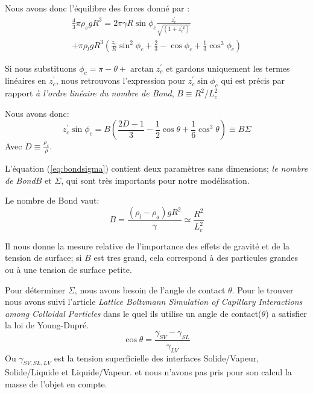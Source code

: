         Nous avons donc l'équilibre des forces donné par :
        \begin{multline}
            \frac{4}{3}\pi\rho_{s}gR^3 =2\pi\gamma R \sin\phi_c \frac{z_c^{'}}{\sqrt{(1+z_c^{'2})}} 
            \\+ \pi\rho_l g R^3 \left(\frac{z_c}{R}\sin^2 \phi_c + \frac{2}{3}-\cos\phi_c+\frac{1}{3}\cos^3 \phi_c\right)
            \label{eq:BalanceOfForces}
        \end{multline}


        Si nous substituons \(\phi_c = \pi - \theta + \arctan z_c^{'}\) et gardons uniquement les termes linéaires en \(z_c^{'}\), nous retrouvons l'expression pour \(z_c^{'}\sin \phi_c\) qui est précis par rapport \textit{à l'ordre linéaire du nombre de Bond}, \(B \equiv R^2/L_c^2\) 

        Nous avons donc:
        \begin{equation}
            z_c^{'}\sin \phi_c = B\left(\frac{2D-1}{3}-\frac{1}{2}\cos \theta + \frac{1}{6} \cos^3 \theta\right) \equiv B\Sigma
            \label{eq:bondsigma}
        \end{equation}
        Avec \(D \equiv \frac{\rho_s}{\rho}\).


        L'équation (\ref{eq:bondsigma}) contient deux paramètres sans dimensions; \textit{le nombre de Bond}$B$ et $\Sigma$, qui sont très importants pour notre modélisation.

        Le nombre de Bond vaut:
        \begin{equation}
            B = \frac{(\rho_l-\rho_{a})gR^2}{\gamma} \simeq \frac{R^2}{L_c^2}
        \end{equation}

        Il nous donne la mesure relative de l'importance des effets de gravité et de la tension de surface; si $B$ est tres grand, cela correspond à des particules grandes ou à une tension de surface petite. 

        Pour déterminer $\Sigma$, nous avons besoin de l'angle de contact $\theta$. Pour le trouver nous avons suivi l'article \textit{Lattice Boltzmann Simulation of Capillary Interactions among Colloidal Particles}\cite{lattice_boltzmann_caplilary_interaction} dans le quel ils utilise un angle de contact($\theta$) a satisfier la loi de Young-Dupré.
        \begin{equation}
            \cos \theta = \frac{\gamma_{SV}-\gamma_{SL}}{\gamma_{LV}}
        \end{equation}
        Ou $\gamma_{SV,SL,LV}$ est la tension superficielle des interfaces Solide/Vapeur, Solide/Liquide et Liquide/Vapeur.
        et nous n'avons pas pris pour son calcul la masse de l'objet en compte.


